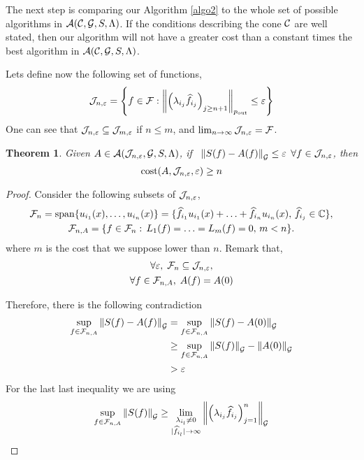 \documentclass[final]{elsarticle}
\newcommand{\pout}{p_{\text{\rm{out}}}}
\newtheorem{theorem}{Theorem}
\theoremstyle{definition}
\theoremstyle{remark}
\begin{document}
The next step is comparing our Algorithm \ref{algo2} to the whole set of possible algorithms in $\ca(\cc,\cg,S,\Lambda)$. If the conditions describing the cone $\cc$ are well stated, then our algorithm will not have a greater cost than a constant times the best algorithm in $\ca(\cc,\cg,S,\Lambda)$.

Lets define now the following set of functions,
\begin{equation*}
\cj_{n,\varepsilon}=\left\{f\in\cf:\norm[\pout]{\left(\lambda_{i_j} \hf_{i_j} \right)_{j\ge n+1}} \le \varepsilon \right\}
\end{equation*}
One can see that $\cj_{n,\varepsilon}\subseteq\cj_{m,\varepsilon}$ if $n\le m$, and $\lim_{n\rightarrow\infty}\cj_{n,\varepsilon}=\cf$.
\begin{theorem}\label{supcost}
   Given $A\in\ca(\cj_{n,\varepsilon},\cg,S,\Lambda)$, if $\,$ $\norm[\cg]{S(f)-A(f)}\le\varepsilon$ $\forall f\in\cj_{n,\varepsilon}$, then
 \begin{equation*}
 \cost(A,\cj_{n,\varepsilon},\varepsilon)\ge n
 \end{equation*}
\end{theorem}
\begin{proof}
Consider the following subsets of $\cj_{n,\varepsilon}$,
\begin{gather*}
\cf_n=\spn\{u_{i_1}(x),\ldots,u_{i_n}(x)\}=\{\hf_{i_1}u_{i_1}(x)+\ldots+\hf_{i_n}u_{i_n}(x),\, \hf_{i_j}\in\complex\},\\
\cf_{n,A}=\{f\in\cf_n:\, L_1(f)=\ldots=L_m(f)=0,\, m<n\}.
\end{gather*}
where $m$ is the cost that we suppose lower than $n$. Remark that,
\begin{gather*}
 \forall\varepsilon,\;\cf_n\subseteq\cj_{n,\varepsilon},\\
 \forall f\in\cf_{n,A},\;A(f)=A(0)
\end{gather*}

Therefore, there is the following contradiction
\begin{align*}
\sup_{f\in\cf_{n,A}}\norm[\cg]{S(f)-A(f)}&=\sup_{f\in\cf_{n,A}}\norm[\cg]{S(f)-A(0)}\\
&\ge\sup_{f\in\cf_{n,A}}\norm[\cg]{S(f)}-\norm[\cg]{A(0)}\\
&>\varepsilon
\end{align*}
For the last last inequality we are using
\begin{equation*}
\sup_{f\in\cf_{n,A}}\norm[\cg]{S(f)}\ge\lim_{\substack{\lambda_{i_l}\neq 0 \\ |\hf_{i_l}|\rightarrow\infty}}\norm[\cg]{\left(\lambda_{i_j} \hf_{i_j} \right)_{j=1}^n}
\end{equation*}
\end{proof}
\end{document}
